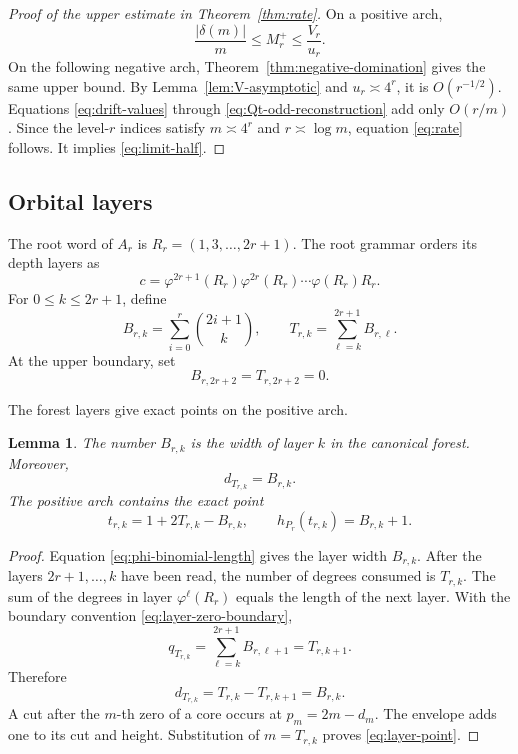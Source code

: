 \documentclass[11pt]{article}
\newtheorem{lemma}[theorem]{Lemma}
\theoremstyle{definition}
\theoremstyle{remark}
\begin{document}
\begin{proof}[Proof of the upper estimate in Theorem~\ref{thm:rate}]
On a positive arch,
\[
 \frac{|\delta(m)|}{m}\leq M_r^+\leq\frac{V_r}{u_r}.
\]
On the following negative arch, Theorem~\ref{thm:negative-domination} gives
the same upper bound.  By Lemma~\ref{lem:V-asymptotic} and
\(u_r\asymp4^r\), it is \(O(r^{-1/2})\).  Equations
\eqref{eq:drift-values} through \eqref{eq:Qt-odd-reconstruction} add only
\(O(r/m)\).  Since the level-\(r\) indices satisfy \(m\asymp4^r\) and
\(r\asymp\log m\), equation \eqref{eq:rate} follows.  It implies
\eqref{eq:limit-half}.
\end{proof}

\subsection{Orbital layers}

The root word of \(A_r\) is \(R_r=(1,3,\ldots,2r+1)\).  The root grammar
orders its depth layers as
\[
 c=\varphi^{2r+1}(R_r)\varphi^{2r}(R_r)\cdots\varphi(R_r)R_r.
\]
For \(0\leq k\leq2r+1\), define
\begin{equation}
\label{eq:B-layer}
 B_{r,k}=\sum_{i=0}^r\binom{2i+1}{k},
 \qquad
 T_{r,k}=\sum_{\ell=k}^{2r+1}B_{r,\ell}.
\end{equation}
At the upper boundary, set
\begin{equation}
\label{eq:layer-zero-boundary}
 B_{r,2r+2}=T_{r,2r+2}=0.
\end{equation}

The forest layers give exact points on the positive arch.
\begin{lemma}
\label{lem:layer-points}
The number \(B_{r,k}\) is the width of layer \(k\) in the canonical forest.
Moreover,
\begin{equation*}
 d_{T_{r,k}}=B_{r,k}.
\end{equation*}
The positive arch contains the exact point
\begin{equation}
\label{eq:layer-point}
 t_{r,k}=1+2T_{r,k}-B_{r,k},
 \qquad
 h_{P_r}(t_{r,k})=B_{r,k}+1.
\end{equation}
\end{lemma}

\begin{proof}
Equation \eqref{eq:phi-binomial-length} gives the layer width
\(B_{r,k}\).  After the layers \(2r+1,\ldots,k\) have been read, the number
of degrees consumed is \(T_{r,k}\).  The sum of the degrees in layer
\(\varphi^\ell(R_r)\) equals the length of the next layer.  With the
boundary convention \eqref{eq:layer-zero-boundary},
\[
 q_{T_{r,k}}
 =\sum_{\ell=k}^{2r+1}B_{r,\ell+1}
 =T_{r,k+1}.
\]
Therefore
\[
 d_{T_{r,k}}=T_{r,k}-T_{r,k+1}=B_{r,k}.
\]
A cut after the \(m\)-th zero of a core occurs at
\(p_m=2m-d_m\).  The envelope adds one to its cut and height.  Substitution
of \(m=T_{r,k}\) proves \eqref{eq:layer-point}.
\end{proof}
\end{document}

